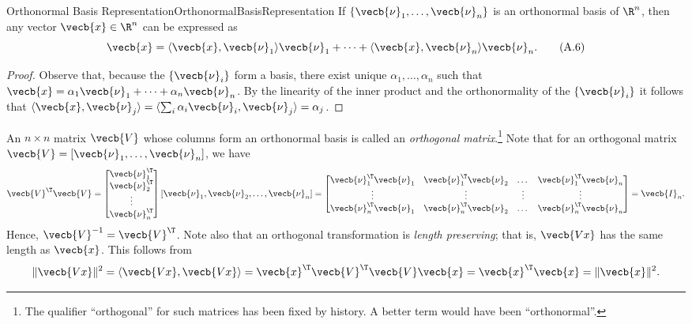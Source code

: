 \begin{thm}{Orthonormal Basis Representation}{OrthonormalBasisRepresentation}
	If $\{\vecb{\nu}_1, \dots, \vecb{\nu}_n\}$ is an orthonormal basis of $\R^n$, then any vector $\vecb{x} \in \R^n$ can be expressed as
	\begin{equation}
		\vecb{x} = \langle \vecb{x}, \vecb{\nu}_1 \rangle \vecb{\nu}_1 + \dots + \langle \vecb{x}, \vecb{\nu}_n \rangle \vecb{\nu}_n. \tag{A.6}
	\end{equation}
\end{thm}
\begin{proof}
	Observe that, because the $\{\vecb{\nu}_i\}$ form a basis, there exist unique $\alpha_1, \dots, \alpha_n$ such that $\vecb{x} = \alpha_1 \vecb{\nu}_1 + \dots + \alpha_n \vecb{\nu}_n$. By the linearity of the inner product and the orthonormality of the $\{\vecb{\nu}_i\}$ it follows that $\langle \vecb{x}, \vecb{\nu}_j \rangle = \langle \sum_i \alpha_i \vecb{\nu}_i, \vecb{\nu}_j \rangle = \alpha_j$.
\end{proof}
An $n \times n$ matrix $\vecb{V}$ whose columns form an orthonormal basis is called an \textit{orthogonal matrix}.\footnote{The qualifier ``orthogonal'' for such matrices has been fixed by history. A better term would have been ``orthonormal''.} Note that for an orthogonal matrix $\vecb{V} = [\vecb{\nu}_1, \dots, \vecb{\nu}_n]$, we have
\begin{equation*}
	\vecb{V}^\T \vecb{V} =
	\begin{bmatrix}
		\vecb{\nu}_1^\T \\
		\vecb{\nu}_2^\T \\
		\vdots          \\
		\vecb{\nu}_n^\T
	\end{bmatrix}
	[\vecb{\nu}_1, \vecb{\nu}_2, \dots, \vecb{\nu}_n] =
	\begin{bmatrix}
		\vecb{\nu}_1^\T \vecb{\nu}_1 & \vecb{\nu}_1^\T \vecb{\nu}_2 & \dots  & \vecb{\nu}_1^\T \vecb{\nu}_n \\
		\vdots                       & \vdots                       & \vdots & \vdots                       \\
		\vecb{\nu}_n^\T \vecb{\nu}_1 & \vecb{\nu}_n^\T \vecb{\nu}_2 & \dots  & \vecb{\nu}_n^\T \vecb{\nu}_n
	\end{bmatrix}
	= \vecb{I}_n.
\end{equation*}
Hence, $\vecb{V}^{-1} = \vecb{V}^\T$. Note also that an orthogonal transformation is \textit{length preserving}; that is, $\vecb{Vx}$ has the same length as $\vecb{x}$. This follows from
\begin{equation*}
	\|\vecb{Vx}\|^2 = \langle \vecb{Vx}, \vecb{Vx} \rangle = \vecb{x}^\T \vecb{V}^\T \vecb{V} \vecb{x} = \vecb{x}^\T \vecb{x} = \|\vecb{x}\|^2.
\end{equation*}
